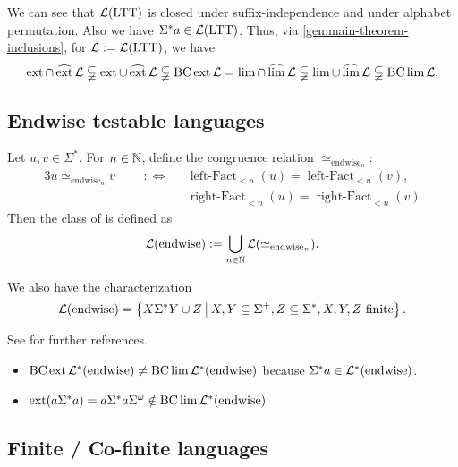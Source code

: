 We can see that $\mathcal{L}(\textup{\textrm{LTT}})$ is closed under suffix-independence and under alphabet permutation. Also we have $\Sigma^*a \in \mathcal{L}(\textup{\textrm{LTT}})$. Thus, via \cref{gen:main-theorem-inclusions}, for $\mathcal{L} := \mathcal{L}(\textup{\textrm{LTT}})$, we have
\[ \operatorname{ext} \cap \operatorname{\widehat{ext}} \mathcal{L} \subsetneqq
\operatorname{ext} \cup \operatorname{\widehat{ext}} \mathcal{L} \subsetneqq
\operatorname{BC} \operatorname{ext} \mathcal{L} =
\lim \cap \operatorname{\widehat{lim}} \mathcal{L} \subsetneqq
\lim \cup \operatorname{\widehat{lim}} \mathcal{L} \subsetneqq
\operatorname{BC} \lim \mathcal{L} . \]


\subsection{Endwise testable languages}
\label{lang:endwise}
Let $u,v \in \Sigma^*$. For $n \in \mathbb{N}$, define the congruence relation $\simeq_{\text{endwise}_n}$:
\begin{alignat*}{3}
u \simeq_{\text{endwise}_n} v \ \ \ && :\Leftrightarrow \ \ \ & \operatorname{left-Fact}_{<n}(u) = \operatorname{left-Fact}_{<n}(v) , \\
&&& \operatorname{right-Fact}_{<n}(u) = \operatorname{right-Fact}_{<n}(v)
\end{alignat*}
Then the class of  is defined as
\[ \mathcal{L}(\textup{\textrm{endwise}}) := \bigcup_{n\in\mathbb{N}} \mathcal{L}(\simeq_{\text{endwise}_n}) . \]

We also have the characterization
\[ \Lang(\mathtext{endwise}) = \Set{X \Sigma^* Y \cup Z}{X,Y \subseteq \Sigma^+, Z \subseteq \Sigma^*, \text{$X,Y,Z$ finite}} . \]

See \cite[Section 2.4]{ConcHierR104} for further references.

\begin{itemize}
\item $\operatorname{BC} \operatorname{ext} \mathcal{L}^*(\textup{\textrm{endwise}}) \neq \operatorname{BC} \lim \mathcal{L}^*(\textup{\textrm{endwise}})$ because $\Sigma^*a \in \mathcal{L}^*(\textup{\textrm{endwise}})$.
\item $\operatorname{ext}(a\Sigma^* a) = a \Sigma^* a \Sigma^\omega \notin \operatorname{BC} \lim \mathcal{L}^*(\textup{\textrm{endwise}})$
\end{itemize}

\subsection{Finite / Co-finite languages}
\label{lang:finite}

